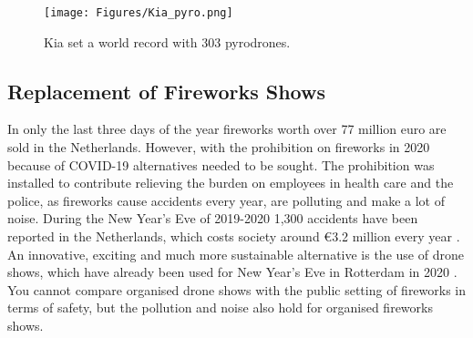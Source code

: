 \begin{figure}[h]
    \centering
    \texttt{[image: Figures/Kia\_pyro.png]}
    \caption{Kia set a world record with 303 pyrodrones. \cite{guinnesspyro}}
    \label{fig:Kia_pyro}
\end{figure}



\begin{comment}
The objective of the Market Analysis is to establish the competitive cost and volume of the market for the
product or for services the product can provide. This is derived from the current market for comparable
products or services and an assessment of the added value of new technology or solutions that could be
implemented. Aspects that should be included are the prediction of future markets, the establishing of
new markets, and the share you foresee to obtain in these markets. Proper market segmentation may
help to address these aspects. In addition, a SWOT analysis (Strengths, Weaknesses, Opportunities,
Threats) should be included in the market analysis as well.
A first version of the Market Analysis is produced for the Baseline Report. Its major purpose is to establish
a target cost for the system or service, and to generate desired functions and requirements based on the
cost and other demands from the market to be competitive. For the Final Report the Market Analysis is
updated for the actual characteristics and estimated cost of the product or service.
\end{comment}


\subsection{Replacement of Fireworks Shows}
In only the last three days of the year fireworks worth over 77 million euro are sold in the Netherlands. However, with the prohibition on fireworks in 2020 because of COVID-19 alternatives needed to be sought. The prohibition was installed to contribute relieving the burden on employees in health care and the police, as fireworks cause accidents every year, are polluting and make a lot of noise. During the New Year's Eve of 2019-2020 1,300 accidents have been reported in the Netherlands, which costs society around €3.2 million every year \cite{vuurwerkongevallen}.  An innovative, exciting and much more sustainable alternative is the use of drone shows, which have already been used for New Year's Eve in Rotterdam in 2020 \cite{droneshowrotterdam}. 
You cannot compare organised drone shows with the public setting of fireworks in terms of safety, but the pollution and noise also hold for organised fireworks shows.

